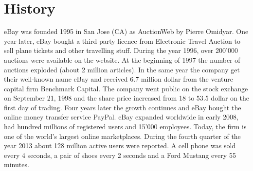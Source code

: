 \section{History}
eBay was founded 1995 in San Jose (CA) as AuctionWeb by Pierre Omidyar. One year later, eBay bought a third-party licence from Electronic Travel Auction to sell plane tickets and other travelling stuff. During the year 1996, over 200'000 auctions were available on the website. At the beginning of 1997 the number of auctions exploded (about 2 million articles). In the same year the company get their well-known name eBay and received 6.7 million dollar from the venture capital firm Benchmark Capital. The company went public on the stock exchange on September 21, 1998 and the share price increased from 18 to 53.5 dollar on the first day of trading. Four years later the growth continues and eBay bought the online money transfer service PayPal. eBay expanded worldwide in early 2008, had hundred millions of registered users and 15'000 employees. Today, the firm is one of the world's largest online marketplaces. During the fourth quarter of the year 2013 about 128 million active users were reported. A cell phone was sold every 4 seconds, a pair of shoes every 2 seconds and a Ford Mustang every 55 minutes.

